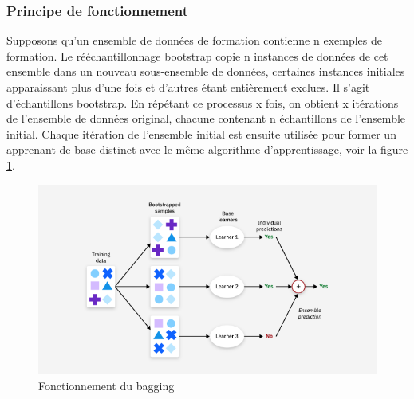 \subsubsection*{Principe de fonctionnement}
Supposons qu'un ensemble de données de formation contienne n exemples de formation. Le rééchantillonnage bootstrap copie n instances de données de cet ensemble dans un nouveau sous-ensemble de données, certaines instances initiales apparaissant plus d'une fois et d'autres étant entièrement exclues. Il s'agit d'échantillons bootstrap. En répétant ce processus x fois, on obtient x itérations de l'ensemble de données original, chacune contenant n échantillons de l'ensemble initial. Chaque itération de l'ensemble initial est ensuite utilisée pour former un apprenant de base distinct avec le même algorithme d'apprentissage, voir la figure \ref{fig:bagging}.
\begin{figure}[!h]
	\centering
	\includegraphics[width=0.9\linewidth]{images/bagging}
	\caption{Fonctionnement du bagging~\cite{ensIBM}}
	\label{fig:bagging}
\end{figure}



